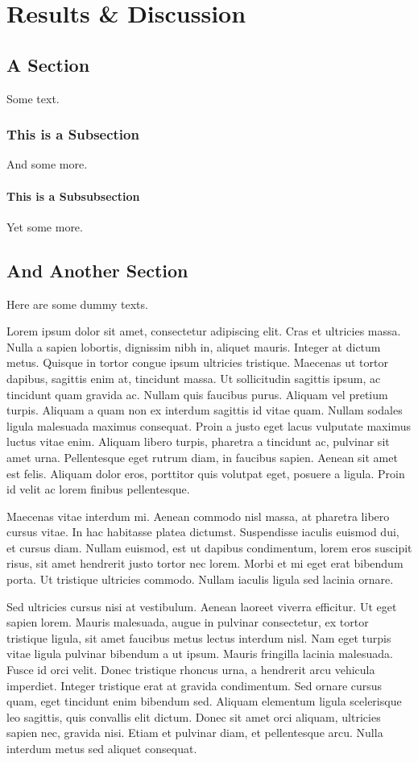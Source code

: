 \chapter{Results \& Discussion}\label{result_discussion}


\section{A Section}
Some text.
\subsection{This is a Subsection}
And some more.
\subsubsection{This is a Subsubsection}
Yet some more.

\section{And Another Section}

Here are some dummy texts.

Lorem ipsum dolor sit amet, consectetur adipiscing elit. Cras et
ultricies massa. Nulla a sapien lobortis, dignissim nibh in, aliquet
mauris. Integer at dictum metus. Quisque in tortor congue ipsum
ultricies tristique. Maecenas ut tortor dapibus, sagittis enim at,
tincidunt massa. Ut sollicitudin sagittis ipsum, ac tincidunt quam
gravida ac. Nullam quis faucibus purus. Aliquam vel pretium
turpis. Aliquam a quam non ex interdum sagittis id vitae quam. Nullam
sodales ligula malesuada maximus consequat. Proin a justo eget lacus
vulputate maximus luctus vitae enim. Aliquam libero turpis, pharetra a
tincidunt ac, pulvinar sit amet urna. Pellentesque eget rutrum diam,
in faucibus sapien. Aenean sit amet est felis. Aliquam dolor eros,
porttitor quis volutpat eget, posuere a ligula. Proin id velit ac
lorem finibus pellentesque.

Maecenas vitae interdum mi. Aenean commodo nisl massa, at pharetra
libero cursus vitae. In hac habitasse platea dictumst. Suspendisse
iaculis euismod dui, et cursus diam. Nullam euismod, est ut dapibus
condimentum, lorem eros suscipit risus, sit amet hendrerit justo
tortor nec lorem. Morbi et mi eget erat bibendum porta. Ut tristique
ultricies commodo. Nullam iaculis ligula sed lacinia ornare.

Sed ultricies cursus nisi at vestibulum. Aenean laoreet viverra
efficitur. Ut eget sapien lorem. Mauris malesuada, augue in pulvinar
consectetur, ex tortor tristique ligula, sit amet faucibus metus
lectus interdum nisl. Nam eget turpis vitae ligula pulvinar bibendum a
ut ipsum. Mauris fringilla lacinia malesuada. Fusce id orci
velit. Donec tristique rhoncus urna, a hendrerit arcu vehicula
imperdiet. Integer tristique erat at gravida condimentum. Sed ornare
cursus quam, eget tincidunt enim bibendum sed. Aliquam elementum
ligula scelerisque leo sagittis, quis convallis elit dictum. Donec sit
amet orci aliquam, ultricies sapien nec, gravida nisi. Etiam et
pulvinar diam, et pellentesque arcu. Nulla interdum metus sed aliquet
consequat.

